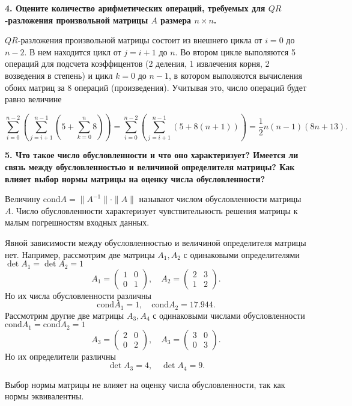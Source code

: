 \documentclass[12pt, a4paper]{article}
\begin{document}
\textbf{4. Оцените количество арифметических операций, требуемых для $QR$-разложения произвольной матрицы $A$ размера $n \times n$.  }

$QR$-разложения произвольной матрицы состоит из внешнего цикла от $i=0$ до $n-2$. В нем находится цикл от $j=i+1$ до $n$. Во втором цикле выполяются 5 операций для подсчета коэффицентов (2 деления, 1 извлечения корня, 2 возведения в степень) и цикл $k=0$ до $n-1$, в котором выполяются вычисления обоих матриц за 8 операций (произведения). Учитывая это, число операций будет равно величине 

\[
\sum\limits_{i=0}^{n-2} \left(\sum\limits_{j=i+1}^{n-1} \left(5+\sum\limits_{k=0}^{n}8\right)\right)=\sum\limits_{i=0}^{n-2} \left(\sum\limits_{j=i+1}^{n-1} \left(5+8\left(n+1\right)\right)\right)= \dfrac{1}{2}n(n-1)(8n+13).
\]

\textbf{5. Что такое число обусловленности и что оно характеризует? Имеется ли связь между обусловленностью и величиной определителя матрицы? Как влияет выбор нормы матрицы на оценку числа обусловленности? }

Величину $\mathrm{cond} A = \| A^{-1} \| \cdot \| A \|$ называют числом обусловленности матрицы $A$. Число обусловленности характеризует чувствительность решения матрицы к малым погрешностям входных данных. 

Явной зависимости между обусловленностью и величиной определителя матрицы нет. Например, рассмотрим две матрицы $A_1,A_2$ с одинаковыми определителями $\det A_1= \det A_2=1$
\[ 
A_1=
\begin{pmatrix}
	1 & 0\\
	0 & 1
\end{pmatrix},
\quad
A_2=
\begin{pmatrix}
	2 & 3\\
	1 & 2
\end{pmatrix}.
\]
Но их числа обусловленности различны
\[ 
\mathrm{cond} A_1=1,
\quad
\mathrm{cond} A_2=17.944.
\]
Рассмотрим другие две матрицы $A_3,A_4$ с одинаковыми числами обусловленности $\mathrm{cond} A_1=\mathrm{cond} A_2=1$
\[ 
A_3=
\begin{pmatrix}
	2 & 0\\
	0 & 2
\end{pmatrix},
\quad
A_3=
\begin{pmatrix}
	3 & 0\\
	0 & 3
\end{pmatrix}.
\]
Но их определители различны
\[ 
\det A_3=4,
\quad
\det A_4=9.
\]

Выбор нормы матрицы не влияет на оценку числа обусловленности, так как нормы эквивалентны.
\end{document}
